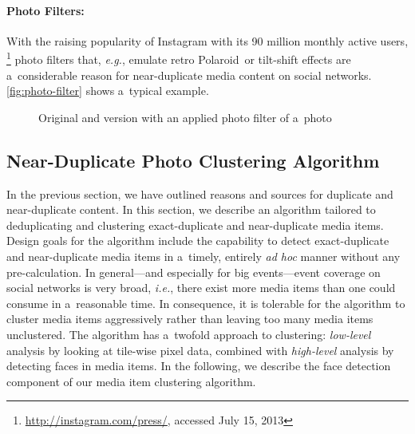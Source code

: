 \paragraph{Photo Filters:}

With the raising popularity of Instagram with its 90 million monthly active users,%
\footnote{\url{http://instagram.com/press/}, accessed July 15, 2013}
photo filters that, \emph{e.g.}, emulate retro Polaroid\texttrademark\ or tilt-shift effects
are a~considerable reason for near-duplicate media content on social networks.
\autoref{fig:photo-filter} shows a~typical example.

\begin{figure}[!h]
  \centering
  \caption{Original and version with an applied photo filter of a~photo}
  \label{fig:photo-filter}  
\end{figure}

\subsection{Near-Duplicate Photo Clustering Algorithm}
\label{sec:near-duplicate-clustering-algorithm}

In the previous section, we have outlined
reasons and sources for duplicate and near-duplicate content.
In this section, we describe an algorithm tailored to
deduplicating and clustering exact-duplicate and near-duplicate media items.
Design goals for the algorithm include
the capability to detect exact-duplicate and near-duplicate media items
in a~timely, entirely \emph{ad hoc} manner without any pre-calculation.
In general---and especially for big events---event coverage on social networks
is very broad, \emph{i.e.}, there exist more media items
than one could consume in a~reasonable time.
In consequence, it is tolerable for the algorithm to cluster media items aggressively
rather than leaving too many media items unclustered.
The algorithm has a~twofold approach to clustering:
\emph{low-level} analysis by looking at tile-wise pixel data,
combined with \emph{high-level} analysis by detecting faces in media items.
In the following, we describe the face detection component
of our media item clustering algorithm.

